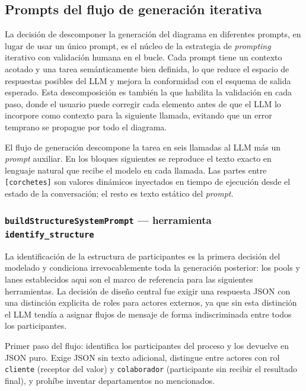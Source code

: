 \subsection{Prompts del flujo de generación iterativa}
\label{subsec:promptsGeneracion}

La decisión de descomponer la generación del diagrama en diferentes prompts, en lugar de usar un único prompt, es el núcleo de la estrategia de \textit{prompting} iterativo con validación humana en el bucle. Cada prompt tiene un contexto acotado y una tarea semánticamente bien definida, lo que reduce el espacio de respuestas posibles del LLM y mejora la conformidad con el esquema de salida esperado. Esta descomposición es también la que habilita la validación en cada paso, donde el usuario puede corregir cada elemento antes de que el LLM lo incorpore como contexto para la siguiente llamada, evitando que un error temprano se propague por todo el diagrama. 

El flujo de generación descompone la tarea en seis llamadas al LLM más un \textit{prompt} auxiliar. En los bloques siguientes se reproduce el texto exacto en lenguaje natural que recibe el modelo en cada llamada. Las partes entre \texttt{[corchetes]} son valores dinámicos inyectados en tiempo de ejecución desde el estado de la conversación; el resto es texto estático del \textit{prompt}.

\subsubsection{\texttt{buildStructureSystemPrompt} — herramienta \texttt{identify\_structure}}

La identificación de la estructura de participantes es la primera decisión del modelado y condiciona irrevocablemente toda la generación posterior: los pools y lanes establecidos aqui son el marco de referencia para las siguientes herramientas. La decisión de diseño central fue exigir una respuesta JSON con una distinción explicita de roles para actores externos, ya que sin esta distinción el LLM tendía a asignar flujos de mensaje de forma indiscriminada entre todos los participantes. 

Primer paso del flujo: identifica los participantes del proceso y los devuelve en JSON puro. Exige JSON sin texto adicional, distingue entre actores con rol \texttt{cliente} (receptor del valor) y \texttt{colaborador} (participante sin recibir el resultado final), y prohíbe inventar departamentos no mencionados.

